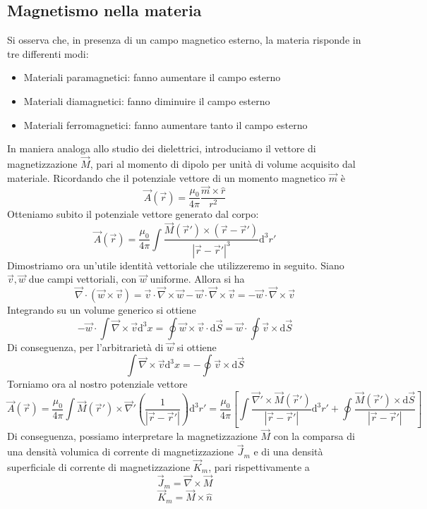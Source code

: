 \documentclass[a4paper,11pt]{book}
\let\oldnabla\nabla
\renewcommand{\nabla}{\vec{\oldnabla}}
\newcommand{\dif}{\mathrm{d}}
\theoremstyle{definition}
\theoremstyle{theorem}
\begin{document}
\subsection{Magnetismo nella materia}
Si osserva che, in presenza di un campo magnetico esterno, la materia risponde in tre differenti modi:
\begin{itemize}
	\item Materiali paramagnetici: fanno aumentare il campo esterno
	\item Materiali diamagnetici: fanno diminuire il campo esterno
	\item Materiali ferromagnetici: fanno aumentare tanto il campo esterno
\end{itemize}
In maniera analoga allo studio dei dielettrici, introduciamo il vettore di magnetizzazione $\vec{M}$, pari al momento di dipolo per unità di volume acquisito dal materiale. Ricordando che il potenziale vettore di un momento magnetico $\vec{m}$ è
\[\vec{A}(\vec{r})=\frac{\mu_0}{4\pi}\frac{\vec{m}\times\hat{r}}{r^2}\]
Otteniamo subito il potenziale vettore generato dal corpo:
\[\vec{A}(\vec{r})=\frac{\mu_0}{4\pi}\int\frac{\vec{M}(\vec{r}')\times(\vec{r}-\vec{r}')}{|\vec{r}-\vec{r}'|^3}\dif^3r'\]
Dimostriamo ora un'utile identità vettoriale che utilizzeremo in seguito. Siano $\vec{v},\vec{w}$ due campi vettoriali, con $\vec{w}$ uniforme. Allora si ha
\[\nabla\cdot(\vec{w}\times\vec{v})=\vec{v}\cdot\nabla\times\vec{w}-\vec{w}\cdot\nabla\times\vec{v}=-\vec{w}\cdot\nabla\times\vec{v}\]
Integrando su un volume generico si ottiene
\[-\vec{w}\cdot\int\nabla\times\vec{v}\dif^3x=\oint\vec{w}\times\vec{v}\cdot\dif\vec{S}=\vec{w}\cdot\oint\vec{v}\times\dif\vec{S}\]
Di conseguenza, per l'arbitrarietà di $\vec{w}$ si ottiene
\[\int\nabla\times\vec{v}\dif^3x=-\oint\vec{v}\times\dif\vec{S}\]
Torniamo ora al nostro potenziale vettore
\[\vec{A}(\vec{r})=\frac{\mu_0}{4\pi}\int\vec{M}(\vec{r}')\times\nabla'\left(\frac{1}{|\vec{r}-\vec{r}'|}\right)\dif^3r'=\frac{\mu_0}{4\pi}\left[\int\frac{\nabla'\times\vec{M}(\vec{r}')}{|\vec{r}-\vec{r}'|}\dif^3r'+\oint\frac{\vec{M}(\vec{r}')\times\dif\vec{S}}{|\vec{r}-\vec{r}'|}\right]\]
Di conseguenza, possiamo interpretare la magnetizzazione $\vec{M}$ con la comparsa di una densità volumica di corrente di magnetizzazione $\vec{J}_m$ e di una densità superficiale di corrente di magnetizzazione $\vec{K}_m$, pari rispettivamente a
\[\vec{J}_m=\nabla\times\vec{M}\]
\[\vec{K}_m=\vec{M}\times\hat{n}\]
\end{document}
